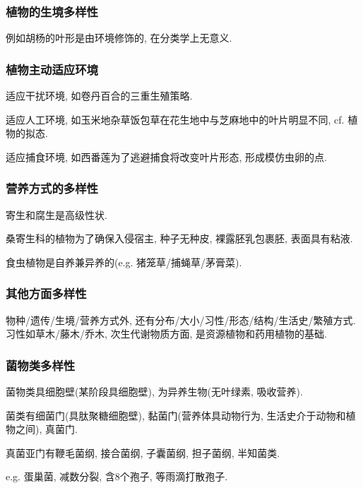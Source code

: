 \documentclass{ctexart}
\begin{document}
\subsubsection{植物的生境多样性} %
\label{ssub:植物的生境多样性}

例如胡杨的叶形是由环境修饰的, 在分类学上无意义.


\subsubsection{植物主动适应环境} %
\label{ssub:植物主动适应环境}

适应干扰环境, 如卷丹百合的三重生殖策略.
\par
适应人工环境, 如玉米地杂草饭包草在花生地中与芝麻地中的叶片明显不同, cf. 植物的拟态.
\par
适应捕食环境, 如西番莲为了逃避捕食将改变叶片形态, 形成模仿虫卵的点.


\subsubsection{营养方式的多样性} %
\label{ssub:营养方式的多样性}

寄生和腐生是高级性状.
\par
桑寄生科的植物为了确保入侵宿主, 种子无种皮, 裸露胚乳包裹胚, 表面具有粘液.
\par
食虫植物是自养兼异养的(e.g. 猪笼草/捕蝇草/茅膏菜). 


\subsubsection{其他方面多样性} %
\label{ssub:其他方面多样性}

物种/遗传/生境/营养方式外, 还有分布/大小/习性/形态/结构/生活史/繁殖方式. 习性如草木/藤木/乔木, 次生代谢物质方面, 是资源植物和药用植物的基础.


\subsubsection{菌物类多样性} %
\label{ssub:菌物类多样性}

菌物类具细胞壁(某阶段具细胞壁), 为异养生物(无叶绿素, 吸收营养).
\par
菌类有细菌门(具肽聚糖细胞壁), 黏菌门(营养体具动物行为, 生活史介于动物和植物之间), 真菌门.
\par
真菌亚门有鞭毛菌纲, 接合菌纲, 子囊菌纲, 担子菌纲, 半知菌类.
\par
e.g. 蛋巢菌, 减数分裂, 含8个孢子, 等雨滴打散孢子.
\end{document}
